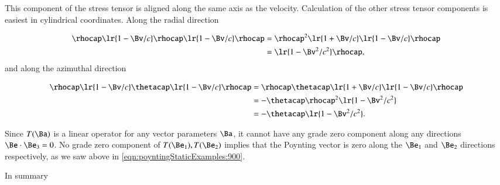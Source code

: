This component of the stress tensor is aligned along the same axis as the velocity.
Calculation of the other stress tensor components is easiest in cylindrical coordinates.  Along the radial direction

\begin{dmath}\label{eqn:poyntingStaticExamples:1020}
\begin{aligned}
\rhocap \lr{ 1 - \Bv/c } \rhocap \lr{1 - \Bv/c} \rhocap
&=
\rhocap^2 \lr{ 1 + \Bv/c} \lr{1 - \Bv/c} \rhocap \\
&= \lr{1 - \Bv^2/c^2} \rhocap,
\end{aligned}
\end{dmath}
and along the azimuthal direction

\begin{dmath}\label{eqn:poyntingStaticExamples:1100}
\begin{aligned}
\rhocap \lr{ 1 - \Bv/c } \thetacap \lr{1 - \Bv/c} \rhocap
&=
\rhocap \thetacap \lr{1 + \Bv/c} \lr{1 - \Bv/c} \rhocap \\
&=
-\thetacap \rhocap^2 \lr{1 - \Bv^2/c^2} \\
&=
-\thetacap \lr{1 - \Bv^2/c^2}.
\end{aligned}
\end{dmath}

Since \( T(\Ba) \) is a linear operator for any vector parameters \( \Ba \), it cannot have any grade zero component along any directions \( \Be \cdot \Be_3 = 0 \).
No grade zero component of \( T(\Be_1), T(\Be_2) \) implies that the Poynting vector is zero along the \( \Be_1 \) and \( \Be_2 \) directions respectively, as we saw above in
\cref{eqn:poyntingStaticExamples:900}.

%
%
%

In summary

